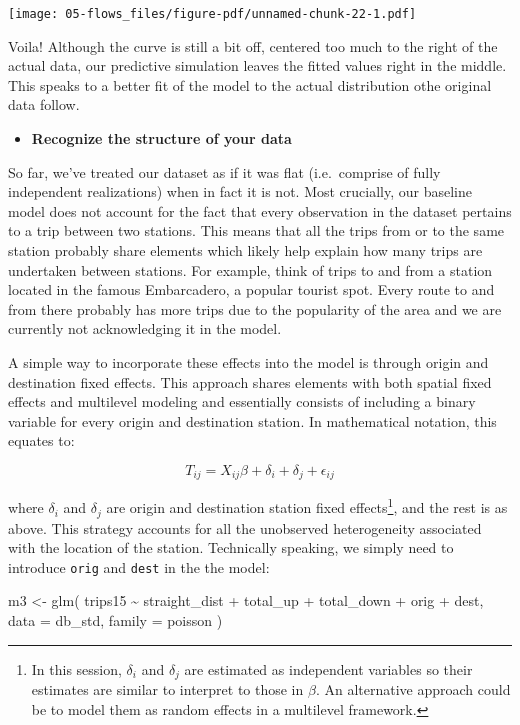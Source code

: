 \documentclass[
  letterpaper,
  DIV=11,
  numbers=noendperiod,
  oneside]{scrreprt}
\newenvironment{Shaded}{\begin{snugshade}}{\end{snugshade}}
\newcommand{\AttributeTok}[1]{\textcolor[rgb]{0.40,0.45,0.13}{#1}}
\newcommand{\FunctionTok}[1]{\textcolor[rgb]{0.28,0.35,0.67}{#1}}
\newcommand{\NormalTok}[1]{\textcolor[rgb]{0.00,0.23,0.31}{#1}}
\newcommand{\OtherTok}[1]{\textcolor[rgb]{0.00,0.23,0.31}{#1}}
\newcommand{\StringTok}[1]{\textcolor[rgb]{0.13,0.47,0.30}{#1}}
\providecommand{\tightlist}{%
  \setlength{\itemsep}{0pt}\setlength{\parskip}{0pt}}\usepackage{longtable,booktabs,array}
\begin{document}
\texttt{[image: 05-flows\_files/figure-pdf/unnamed-chunk-22-1.pdf]}

Voila! Although the curve is still a bit off, centered too much to the
right of the actual data, our predictive simulation leaves the fitted
values right in the middle. This speaks to a better fit of the model to
the actual distribution othe original data follow.

\begin{itemize}
\tightlist
\item
  \textbf{Recognize the structure of your data}
\end{itemize}

So far, we've treated our dataset as if it was flat (i.e.~comprise of
fully independent realizations) when in fact it is not. Most crucially,
our baseline model does not account for the fact that every observation
in the dataset pertains to a trip between two stations. This means that
all the trips from or to the same station probably share elements which
likely help explain how many trips are undertaken between stations. For
example, think of trips to and from a station located in the famous
Embarcadero, a popular tourist spot. Every route to and from there
probably has more trips due to the popularity of the area and we are
currently not acknowledging it in the model.

A simple way to incorporate these effects into the model is through
origin and destination fixed effects. This approach shares elements with
both spatial fixed effects and multilevel modeling and essentially
consists of including a binary variable for every origin and destination
station. In mathematical notation, this equates to:

\[
T_{ij} = X_{ij}\beta + \delta_i + \delta_j + \epsilon_{ij}
\]

where \(\delta_i\) and \(\delta_j\) are origin and destination station
fixed effects\footnote{In this session, \(\delta_i\) and \(\delta_j\)
  are estimated as independent variables so their estimates are similar
  to interpret to those in \(\beta\). An alternative approach could be
  to model them as random effects in a multilevel framework.}, and the
rest is as above. This strategy accounts for all the unobserved
heterogeneity associated with the location of the station. Technically
speaking, we simply need to introduce \texttt{orig} and \texttt{dest} in
the the model:

\begin{Shaded}
\begin{Highlighting}[]
\NormalTok{m3 }\OtherTok{\textless{}{-}} \FunctionTok{glm}\NormalTok{(}
  \StringTok{\textquotesingle{}trips15 \textasciitilde{} straight\_dist + total\_up + total\_down + orig + dest\textquotesingle{}}\NormalTok{, }
  \AttributeTok{data =}\NormalTok{ db\_std,}
  \AttributeTok{family =}\NormalTok{ poisson}
\NormalTok{)}
\end{Highlighting}
\end{Shaded}
\end{document}
